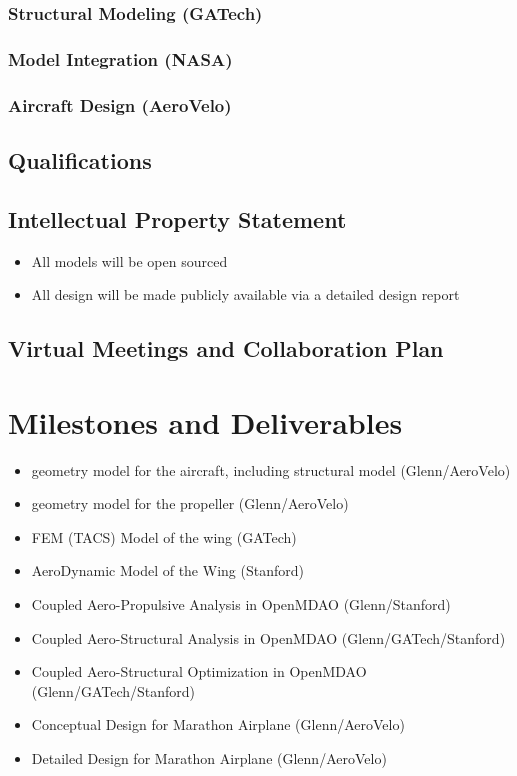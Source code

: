 \documentclass[]{report}
\begin{document}
        \subsubsection{Structural Modeling (GATech)}
        \subsubsection{Model Integration (NASA)}
        \subsubsection{Aircraft Design (AeroVelo)}

    \subsection{Qualifications}
    \subsection{Intellectual Property Statement}
        \begin{itemize}
            \item All models will be open sourced
            \item All design will be made publicly available via a detailed design report
        \end{itemize}

    \subsection{Virtual Meetings and Collaboration Plan}

\section{Milestones and Deliverables}

    \begin{itemize}
        \item geometry model for the aircraft, including structural model (Glenn/AeroVelo)
        \item geometry model for the propeller (Glenn/AeroVelo)
        \item FEM (TACS) Model of the wing (GATech)
        \item AeroDynamic Model of the Wing (Stanford)
        \item Coupled Aero-Propulsive Analysis in OpenMDAO (Glenn/Stanford)
        \item Coupled Aero-Structural Analysis in OpenMDAO (Glenn/GATech/Stanford)
        \item Coupled Aero-Structural Optimization in OpenMDAO (Glenn/GATech/Stanford)
        \item Conceptual Design for Marathon Airplane (Glenn/AeroVelo)
        \item Detailed Design for Marathon Airplane (Glenn/AeroVelo)
    \end{itemize}
\end{document}
